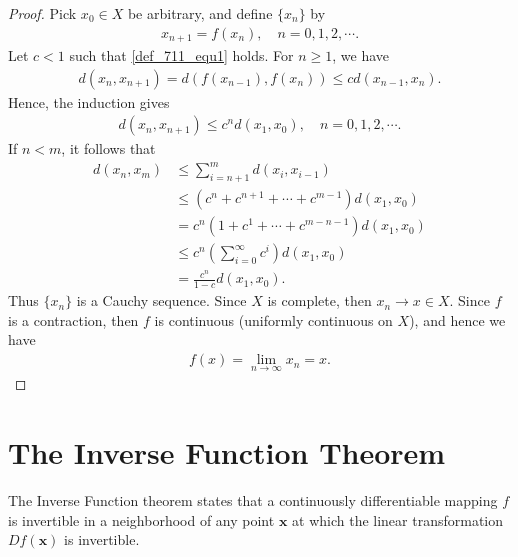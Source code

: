 \documentclass[11pt]{book}
\theoremstyle{definition}
\numberwithin{equation}{chapter}
\begin{document}
\begin{proof}
Pick $x_0 \in X$ be arbitrary, and define $\{x_n\}$ by 
\begin{align*}
    x_{n+1} = f(x_n), \quad n = 0,1,2,\cdots.
\end{align*}
Let $c < 1$ such that \eqref{def_711_equ1} holds. For $n \geq 1$, we have
\begin{align*}
    d(x_n,x_{n+1}) = d(f(x_{n-1}),f(x_n)) \leq c d(x_{n-1},x_n).
\end{align*}
Hence, the induction gives
\begin{align*}
    d(x_n,x_{n+1}) \leq c^n d(x_1, x_0), \quad n = 0,1,2,\cdots.
\end{align*}
If $n < m$, it follows that
\begin{align*}
    d(x_n,x_m) & \leq \sum^m_{i=n+1} d(x_i,x_{i-1}) \\
    & \leq \left(c^n + c^{n+1} + \cdots + c^{m-1}\right) d(x_1,x_0) \\
    & = c^n \left(1 + c^1 + \cdots + c^{m-n-1}\right) d(x_1,x_0) \\
    & \leq c^n \left(\sum^\infty_{i=0} c^i \right) d(x_1,x_0)  \\
    & = \frac{c^n}{1 - c} d(x_1,x_0).
\end{align*}
Thus $\{x_n\}$ is a Cauchy sequence. Since $X$ is complete, then $x_n \to x \in X$. Since $f$ is a contraction, then $f$ is continuous (uniformly continuous on $X$), and hence we have
\begin{align*}
    f(x) = \lim_{n\to\infty} x_n = x.
\end{align*}
\end{proof}

\medskip


\section{The Inverse Function Theorem}

The Inverse Function theorem states that a continuously differentiable mapping $f$ is invertible in a neighborhood of any point $\mathbf{x}$ at which the linear transformation $Df(\mathbf{x})$ is invertible.

\medskip
\end{document}

